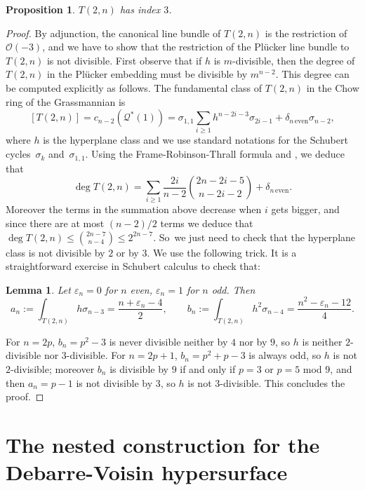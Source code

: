\documentclass[11pt]{article}
\let\epsilon\varepsilon
\let\mathcal\mathscr
\theoremstyle{plain}
\newtheorem{prop}[theorem]{Proposition}
\newtheorem{lemma}[theorem]{Lemma}
\theoremstyle{definition}
\newcommand{\sheaf}[1]{\mathcal{#1}}
\newcommand{\ko}{\sheaf{O}}\let\OO\ko\let\cO\ko
\newcommand{\kq}{\sheaf{Q}}
\begin{document}
\begin{prop} $T(2,n)$ has index $3$. \end{prop}

\begin{proof}
By adjunction, the canonical line bundle of $T(2,n)$ is the restriction of
$\ko(-3)$, and we have to show that the restriction of the Plücker line
bundle to $T(2,n)$ is not divisible. First observe that if $h$ is $m$-divisible,
then the degree of $T(2,n)$ in the Plücker embedding must be divisible by
$m^{n-2}$. This degree can be computed explicitly as follows. The fundamental class
of $T(2,n)$ in the Chow ring of the Grassmannian is
\[
[T(2,n)]=c_{n-2}(\kq^*(1))=\sigma_{1,1}\sum_{i\ge 1}h^{n-2i-3}\sigma_{2i-1}+\delta_{n\,\text{even}}\sigma_{n-2},
\]
where $h$ is the hyperplane class and we use standard notations for the Schubert cycles~$\sigma_k$ and~$\sigma_{1,1}$. Using the Frame-Robinson-Thrall formula and \cite[Cor.\,3.2.14]{schubert}, we deduce that
\[
\deg T(2,n) = \sum_{i\ge 1}\frac{2i}{n-2} \binom{2n-2i-5}{n-2i-2}+\delta_{n\,\text{even}}.
\]
Moreover the terms in the summation above
decrease when $i$ gets bigger, and since there are at most $(n-2)/2$ terms we deduce that
$\deg T(2,n)\le \binom{2n-7}{n-4}\le 2^{2n-7}$. So~we just need to check that the hyperplane class is not divisible by $2$ or by $3$. We use the following trick. It is a straightforward exercise in Schubert calculus to check that:

\begin{lemma} Let $\epsilon_n=0$ for $n$ even, $\epsilon_n=1$ for $n$ odd. Then\vspace*{-3pt}
\[
a_n := \int_{T(2,n)}h\sigma_{n-3}=\frac{n+\epsilon_n-4}{2}, \qquad b_n:=\int_{T(2,n)}h^2\sigma_{n-4}=\frac{n^2-\epsilon_n-12}{4}.
\]
\end{lemma}

For $n=2p$, $b_{n}=p^2-3$ is never divisible neither by $4$ nor by $9$, so $h$ is neither
$2$-divisible nor $3$-divisible. For $n=2p+1$, $b_{n}=p^2+p-3$ is always odd, so $h$ is not
$2$-divisible; moreover $b_n$ is divisible by $9$ if and only if $p=3$ or $p=5$ mod $9$,
and then $a_n=p-1$ is not divisible by $3$, so $h$ is not $3$-divisible. This concludes
the proof.
\end{proof}

\section{The nested construction for the Debarre-Voisin hypersurface}\label{sect:DV}
\end{document}

